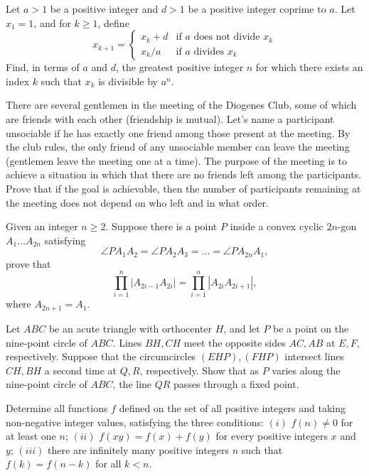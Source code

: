 \documentclass[11pt]{scrartcl}
\begin{document}
\begin{problem}[3159161448000677570]
Let $a > 1$ be a positive integer and $d > 1$ be a positive integer coprime to $a$. Let $x_1=1$, and for $k\geq 1$, define
$$x_{k+1} = \begin{cases}
x_k + d &\text{if } a \text{ does not divide } x_k \\
x_k/a & \text{if } a \text{ divides } x_k
\end{cases}$$Find, in terms of $a$ and $d$, the greatest positive integer $n$ for which there exists an index $k$ such that $x_k$ is divisible by $a^n$.
\end{problem}
\begin{problem}[645068477920006]
There are several gentlemen in the meeting of the Diogenes Club, some of which are friends with each other (friendship is mutual). Let's name a participant unsociable if he has exactly one friend among those present at the meeting. By the club rules, the only friend of any unsociable member can leave the meeting (gentlemen leave the meeting one at a time). The purpose of the meeting is to achieve a situation in which that there are no friends left among the participants. Prove that if the goal is achievable, then the number of participants remaining at the meeting does not depend on who left and in what order.
\end{problem}
\begin{problem}[702587891849077]
	Given an integer $n \geqslant 2$. Suppose there is a point $P$ inside a convex cyclic $2n$-gon $A_1 \ldots A_{2n}$ satisfying$$\angle PA_1A_2 = \angle PA_2A_3 = \ldots = \angle PA_{2n}A_1,$$prove that$$ \prod_{i=1}^{n} \left|A_{2i - 1}A_{2i} \right| = \prod_{i=1}^{n} \left|A_{2i}A_{2i+1} \right|,$$where $A_{2n + 1} = A_1$.
\end{problem}
\begin{problem}[8255863576892581507]
	Let $ABC$ be an acute triangle with orthocenter $H$, and let $P$ be a point on the nine-point circle of $ABC$. Lines $BH, CH$ meet the opposite sides $AC, AB$ at $E, F$, respectively. Suppose that the circumcircles $(EHP), (FHP)$ intersect lines $CH, BH$ a second time at $Q,R$, respectively. Show that as $P$ varies along the nine-point circle of $ABC$, the line $QR$ passes through a fixed point.
\end{problem}
\begin{problem}[6116877365036470315]
	Determine all functions $f$ defined on the set of all positive integers and taking non-negative integer values, satisfying the three conditions:
$(i)$ $f(n) \neq 0$ for at least one $n$;
$(ii)$ $f(x y)=f(x)+f(y)$ for every positive integers $x$ and $y$;
$(iii)$ there are infinitely many positive integers $n$ such that $f(k)=f(n-k)$ for all $k<n$.
\end{problem}
\end{document}
